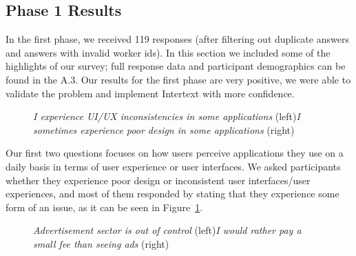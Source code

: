 \subsection{Phase 1 Results}

In the first phase, we received 119 responses (after filtering out duplicate answers and answers with invalid worker ids). In this section we included some of the highlights of our survey; full response data and participant demographics can be found in the  A.3. Our results for the first phase are very positive, we were able to validate the problem and implement Intertext with more confidence.


\begin{figure}[H]
\centering
{}
\vspace*{-5mm}
\caption{\newline\textit{I experience UI/UX inconsistencies in some applications} (left)\newline\textit{I sometimes experience poor design in some applications} (right)} \label{fig:ev_p1_1}
\end{figure}

Our first two questions focuses on how users perceive applications they use on a daily basis in terms of user experience or user interfaces. We asked participants whether they experience poor design or inconsistent user interfaces/user experiences, and most of them responded by stating that they experience some form of an issue, as it can be seen in Figure~\ref{fig:ev_p1_1}.


\begin{figure}[H]
\centering
{}
\vspace*{-5mm}
\caption{\newline\textit{Advertisement sector is out of control} (left)\newline\textit{I would rather pay a small fee than seeing ads} (right)} \label{fig:ev_p1_2}
\end{figure}

